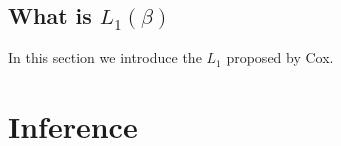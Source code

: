 \documentclass[a4paper,12pt]{article}
\begin{document}
\subsection{What is $L_1\left(\beta\right)$}
\label{sec:what-is}

In this section we introduce the $L_1$ proposed by Cox.

\section{Inference}
\label{sec:inference}






\end{document}
